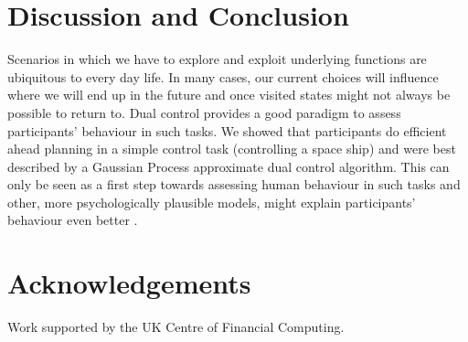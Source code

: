 \documentclass[10pt,letterpaper]{article}
\begin{document}
\section{Discussion and Conclusion}
Scenarios in which we have to explore and exploit underlying functions are ubiquitous to every day life. In many cases, our current choices will influence where we will end up in the future and once visited states might not always be possible to return to. Dual control provides a good paradigm to assess participants' behaviour in such tasks. We showed that participants do efficient ahead planning in a simple control task (controlling a space ship) and were best described by a Gaussian Process approximate dual control algorithm. This can only be seen as a first step towards assessing human behaviour in such tasks and other, more psychologically plausible models, might explain participants' behaviour even better \citep{bramley2015staying}. 
\section{Acknowledgements}
Work supported by the UK Centre of Financial Computing.


\end{document}
